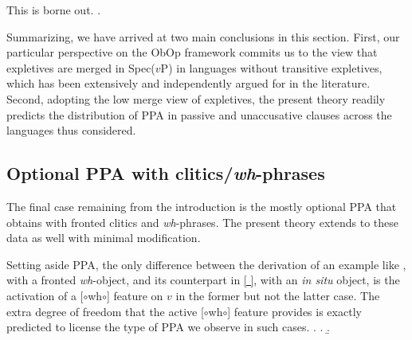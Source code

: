 \documentclass[11pt, letterpaper]{paper_nick}
\newcommand{\fm}[1]{[$\circ$#1$\circ$]}
\begin{document}
This is borne out.
\ex. 


Summarizing, we have arrived at two main conclusions in this section. First, our particular perspective on the ObOp framework commits us to the view that expletives are merged in Spec($v$P) in languages without transitive expletives, which has been extensively and independently argued for in the literature. Second, adopting the low merge view of expletives, the present theory readily predicts the distribution of PPA in passive and unaccusative clauses across the languages thus considered.  

\subsection{Optional PPA with clitics/\emph{wh}-phrases}
The final case remaining from the introduction is the mostly optional PPA that obtains with fronted clitics and \emph{wh}-phrases. The present theory extends to these data as well with minimal modification. 

Setting aside PPA, the only difference between the derivation of an example like \Next, with a fronted \emph{wh}-object, and its counterpart in \ref{ }, with an \emph{in situ} object, is the activation of a \fm{wh} feature on $v$ in the former but not the latter case. The extra degree of freedom that the active \fm{wh} feature provides is exactly predicted to license the type of PPA we observe in such cases. 
\ex. \a. 
\b.
\end{document}
